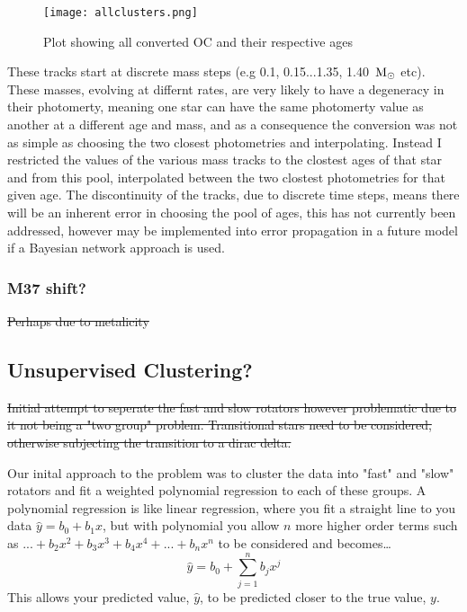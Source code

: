 \documentclass[fleqn,usenatbib]{mnras}
\begin{document}
\begin{figure}
	\centering
	\texttt{[image: allclusters.png]}
	\caption[]{Plot showing all converted OC and their respective ages}
	\label{fig:allclusters}
\end{figure}

These tracks start at discrete mass steps (e.g 0.1, 0.15...1.35, 1.40~$\textup{M}_\odot$ etc).
These masses, evolving at differnt rates, are very likely to have a degeneracy in their photomerty, meaning one star can have the same photomerty value as another at a different age and mass, and as a consequence the conversion was not as simple as choosing the two closest photometries and interpolating.
Instead I restricted the values of the various mass tracks to the clostest ages of that star and from this pool, interpolated between the two clostest photometries for that given age.
The discontinuity of the tracks, due to discrete time steps, means there will be an inherent error in choosing the pool of ages, this has not currently been addressed, however may be implemented into error propagation in a future model if a Bayesian network approach is used. 



\subsubsection{M37 shift?}
\sout{Perhaps due to metalicity}

\subsection{Unsupervised Clustering?}
\sout{Initial attempt to seperate the fast and slow rotators however problematic due to it not being a "two group" problem.
	Transitional stars need to be considered, otherwise subjecting the transition to a dirac delta.}

Our inital approach to the problem was to cluster the data into "fast" and "slow" rotators and fit a weighted polynomial regression to each of these groups.
A polynomial regression is like linear regression, where you fit a straight line to you data $\hat{y} = b_0 + b_1x$, but with polynomial you allow $n$ more higher order terms such as $...+ b_2x^2 + b_3x^3+b_4x^4+...+b_nx^n $ to be considered and becomes\dots
\begin{equation}
	\label{eq:poly}
	\hat{y} = b_0 + \sum_{j = 1}^n b_jx^j
\end{equation}
This allows your predicted value, $\hat{y}$, to be predicted closer to the true value, $y$.
\end{document}
